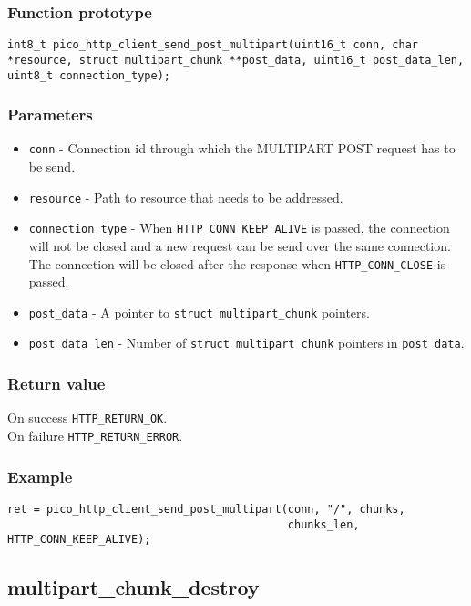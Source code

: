 \subsubsection*{Function prototype}
\texttt{int8\_t pico\_http\_client\_send\_post\_multipart(uint16\_t conn, char *resource, struct multipart\_chunk **post\_data, uint16\_t post\_data\_len, uint8\_t connection\_type);}

\subsubsection*{Parameters}
\begin{itemize}[noitemsep]
\item \texttt{conn} - Connection id through which the MULTIPART POST request has to be send.
\item \texttt{resource} - Path to resource that needs to be addressed.
\item \texttt{connection\_type} - When \texttt{HTTP\_CONN\_KEEP\_ALIVE} is passed, the connection will not be closed and a new request can be send over the same connection. The connection will be closed after the response when \texttt{HTTP\_CONN\_CLOSE} is passed.
\item \texttt{post\_data} - A pointer to \texttt{struct multipart\_chunk} pointers.
\item \texttt{post\_data\_len} - Number of \texttt{struct multipart\_chunk} pointers in \texttt{post\_data}.
\end{itemize}
\subsubsection*{Return value}
On success \texttt{HTTP\_RETURN\_OK}.
\\On failure \texttt{HTTP\_RETURN\_ERROR}.
\subsubsection*{Example}
\begin{verbatim}
ret = pico_http_client_send_post_multipart(conn, "/", chunks, 
                                           chunks_len, HTTP_CONN_KEEP_ALIVE);
\end{verbatim}

\subsection{multipart\_chunk\_destroy}

